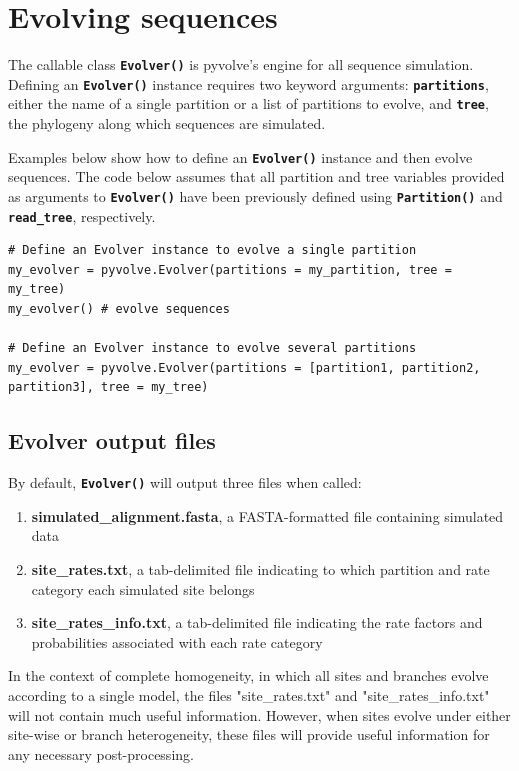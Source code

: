 \documentclass{article}
\newcommand{\code}[1]{\textbf{\texttt{\small{#1}}}}
\begin{document}
\section{Evolving sequences}\label{sec:evolver}

The callable class \code{Evolver()} is pyvolve's engine for all sequence simulation. Defining an \code{Evolver()} instance requires two keyword arguments: \code{partitions}, either the name of a single partition or a list of partitions to evolve, and \code{tree}, the phylogeny along which sequences are simulated.

Examples below show how to define an \code{Evolver()} instance and then evolve sequences. The code below assumes that all partition and tree variables provided as arguments to \code{Evolver()} have been previously defined using \code{Partition()} and \code{read\_tree}, respectively.
\begin{lstlisting}
# Define an Evolver instance to evolve a single partition
my_evolver = pyvolve.Evolver(partitions = my_partition, tree = my_tree)
my_evolver() # evolve sequences

# Define an Evolver instance to evolve several partitions
my_evolver = pyvolve.Evolver(partitions = [partition1, partition2, partition3], tree = my_tree)
\end{lstlisting}



\subsection{Evolver output files}\label{sec:output_files}

By default, \code{Evolver()} will output three files when called:
\begin{enumerate}
	\item \textbf{simulated\_alignment.fasta}, a FASTA-formatted file containing simulated data
	\item \textbf{site\_rates.txt}, a tab-delimited file indicating to which partition and rate category each simulated site belongs
	\item \textbf{site\_rates\_info.txt}, a tab-delimited file indicating the rate factors and probabilities associated with each rate category
\end{enumerate}

In the context of complete homogeneity, in which all sites and branches evolve according to a single model, the files "site\_rates.txt" and "site\_rates\_info.txt" will not contain much useful information. However, when sites evolve under either site-wise or branch heterogeneity, these files will provide useful information for any necessary post-processing.
\end{document}
